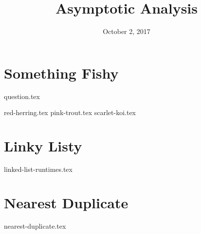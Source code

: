 \documentclass[11pt]{exam}
\title{Asymptotic Analysis}
\date{October 2, 2017}
\begin{document}
\maketitle

\section{Something Fishy}
{question.tex}
\begin{questions}
{red-herring.tex}
{pink-trout.tex}
{scarlet-koi.tex}
\end{questions}

\section{Linky Listy}
\begin{questions}
{linked-list-runtimes.tex}
\end{questions}

\section{Nearest Duplicate}
\begin{questions}
{nearest-duplicate.tex}
\end{questions}
\end{document}
